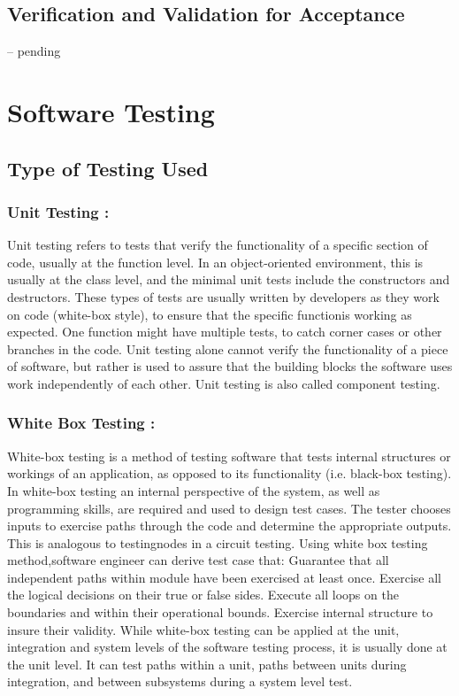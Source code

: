 \documentclass[oneside,a4paper,12pt]{report}
\begin{document}
{\section{Verification and Validation for Acceptance}

-- pending


\chapter{Software Testing}
\section{Type of Testing Used}

\subsection{Unit Testing : }
Unit testing refers to tests that verify the functionality of a specific section of code, usually at the function level. In an object-oriented environment, this is usually at the class level, and the minimal unit tests include the constructors and destructors. These types of tests are usually written by developers as they work on code (white-box style), to ensure that the specific functionis working as expected. One function might have multiple tests, to catch corner cases or other branches in the code. Unit testing alone cannot verify the functionality of a piece of software, but rather is used to assure that the building blocks the software uses work independently of each other. Unit testing is also called component testing.

\subsection{White Box Testing : }
White-box testing is a method of testing software that tests internal structures or workings of an application, as opposed to its functionality (i.e. black-box testing). In white-box testing an internal perspective of the system, as well as programming skills, are required and used to design test cases. The tester chooses inputs to exercise paths through the code and determine the appropriate outputs. This is analogous to testingnodes in a circuit testing. Using white box testing method,software engineer can derive test case that: Guarantee that all independent paths within module have been exercised at least once. Exercise all the logical decisions on their true or false sides. Execute all loops on the boundaries and within their operational bounds. Exercise internal structure to insure their validity. While white-box testing can be applied at the unit, integration and system levels of the software testing process, it is usually done at the unit level. It can test paths within a unit, paths between units during integration, and between subsystems during a system level test.

}
\end{document}
